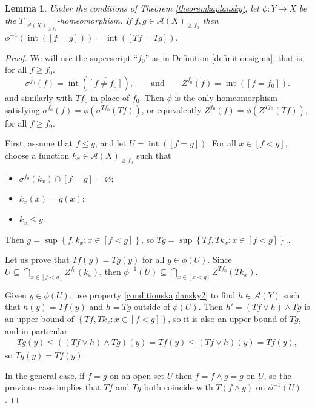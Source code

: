 \documentclass[letter,11pt]{amsart}
\theoremstyle{plain}		\newtheorem{theorem}[generalnumbering]{Theorem}
\theoremstyle{plain}		\newtheorem{corollary}[generalnumbering]{Corollary}
\theoremstyle{definition}		\newtheorem{definition}[generalnumbering]{Definition}
\theoremstyle{definition}		\newtheorem{example}[generalnumbering]{Example}
\theoremstyle{plain}		\newtheorem{proposition}[generalnumbering]{Proposition}
\theoremstyle{plain}		\newtheorem{lemma}[generalnumbering]{Lemma}
\theoremstyle{plain}    \newtheorem{plainstyle}[generalnumbering]{\namefordifferentenvironment}
\theoremstyle{plain}    \newtheorem*{plainstyle*}{\namefordifferentenvironment}
\theoremstyle{definition}    \newtheorem{definitionstyle}[generalnumbering]{\namefordifferentenvironment}
\theoremstyle{definition}    \newtheorem*{definitionstyle*}{\namefordifferentenvironment}
\begin{document}
\begin{lemma}\label{lemmarestrictionoflatticeisomorphismisbasic}
	Under the conditions of Theorem \ref{theoremkaplansky}, let $\phi\colon Y\to X$ be the $T|_{\mathcal{A}(X)_{\geq f_0}}$-homeomorphism. If $f,g\in\mathcal{A}(X)_{\geq{f_0}}$ then $\phi^{-1}(\operatorname{int}([f=g]))=\operatorname{int}([Tf=Tg])$.
\end{lemma}
\begin{proof}
	We will use the superscript ``$f_0$'' as in Definition \ref{definitionsigma}, that is, for all $f\geq f_0$.
	\[\sigma^{f_0}(f)=\operatorname{int}(\overline{[f\neq f_0]}),\qquad\text{and}\qquad Z^{f_0}(f)=\operatorname{int}([f=f_0]).\]
	and similarly with $Tf_0$ in place of $f_0$. Then $\phi$ is the only homeomorphism satisfying $\sigma^{f_0}(f)=\phi(\sigma^{Tf_0}(Tf))$, or equivalently $Z^{f_0}(f)=\phi(Z^{Tf_0}(Tf))$, for all $f\geq f_0$.
	
	First, assume that $f\leq g$, and let $U=\operatorname{int}([f=g])$. For all $x\in[f<g]$, choose a function $k_x\in\mathcal{A}(X)_{\geq f_0}$ such that
	\begin{itemize}
		\item $\sigma^{f_0}(k_x)\cap [f=g]=\varnothing$;
		\item $k_x(x)=g(x)$;
		\item $k_x\leq g$.
	\end{itemize}
	Then $g=\sup\left\{f,k_x:x\in[f<g]\right\}$, so $Tg=\sup\left\{Tf,Tk_x:x\in[f<g]\right\}$..
	
	Let us prove that $Tf(y)=Tg(y)$ for all $y\in\phi(U)$. Since $U\subseteq\bigcap_{x\in[f<g]}Z^{f_0}(k_x)$, then $\phi^{-1}(U)\subseteq\bigcap_{x\in[x<g]}Z^{Tf_0}(Tk_x)$.
	
	Given $y\in\phi(U)$, use property \ref{conditionskaplansky2} to find $h\in\mathcal{A}(Y)$ such that $h(y)=Tf(y)$ and $h=Tg$ outside of $\phi(U)$. Then $h'=(Tf\lor h)\land Tg$ is an upper bound of $\left\{Tf,Tk_x:x\in[f<g]\right\}$, so it is also an upper bound of $Tg$, and in particular
	\begin{align*}
	Tg(y)\leq ((Tf\lor h)\land Tg)(y)=Tf(y)\leq (Tf\lor h)(y)=Tf(y),
	\end{align*}
	so $Tg(y)=Tf(y)$.
	
	In the general case, if $f=g$ on an open set $U$ then $f=f\land g=g$ on $U$, so the previous case implies that $Tf$ and $Tg$ both coincide with $T(f\land g)$ on $\phi^{-1}(U)$.
\end{proof}
\end{document}
